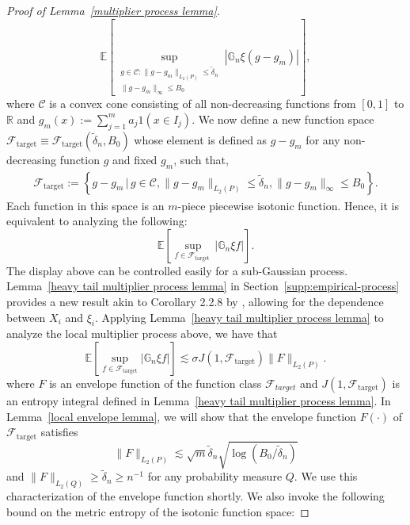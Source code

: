 \documentclass[12pt]{article}
\begin{document}
\begin{appendices}
\begin{proof}[Proof of Lemma~\ref{multiplier process lemma}]
\begin{equation}\nonumber
     \mathbb{E}\left[ 
\sup _{\substack{g \in \mathcal{C}:\|g-g_m\|_{L_2(P)} \leq \tilde\delta_n
\\\|g-g_m\|_{\infty} \leq B_0}}
\left|\mathbb{G}_n \xi(g-g_m)\right|\right],
\end{equation}
where $ \mathcal{C}$ is a convex cone consisting of all non-decreasing functions from $[0,1]$ to $\mathbb{R}$ and $g_m(x) :=\sum_{j=1}^m a_j1(x\in I_j)$. We now define a new function space $\mathcal{F}_{\textrm{target}} \equiv \mathcal{F}_{\textrm{target}}(\tilde \delta_n, B_0)$ whose element is defined as $g-g_m$ for any non-decreasing function $g$ and fixed $g_m$, such that, 
\begin{align}
	\mathcal{F}_{\textrm{target}}:= \left\{g-g_m\, \bigg| \, g \in \mathcal{C}, \|g-g_m\|_{L_2(P)}\le \tilde \delta_n, \|g-g_m\|_\infty \le B_0\right\}.\nonumber
\end{align}
Each function in this space is an $m$-piece piecewise isotonic function. Hence, it is equivalent to analyzing the following:
\begin{equation*}
\mathbb{E}\left[\sup _{f \in \mathcal{F}_{\text {target }}}\left|\mathbb{G}_n \xi f\right|\right].
\end{equation*}
The display above can be controlled easily for a sub-Gaussian process. Lemma~\ref{heavy tail multiplier process lemma} in Section~\ref{supp:empirical-process} provides a new result akin to Corollary 2.2.8 by \cite{van1996weak}, allowing for the dependence between $X_i$ and $\xi_i$. Applying Lemma~\ref{heavy tail multiplier process lemma} to analyze the local multiplier process above, we have that 
\begin{equation}
    \mathbb{E}\left[\sup_{f\in\mathcal{F}_{\textrm{target}}} \left|\mathbb{G}_n \xi f\right|\right] \lesssim \sigma J(1,\mathcal{F}_{\textrm{target}})\|F\|_{L_2(P)}.\nonumber
\end{equation}
where $F$ is an envelope function of the function class $\mathcal{F}_{target}$ and $J(1,\mathcal{F}_{\textrm{target}})$ is an entropy integral defined in Lemma~\ref{heavy tail multiplier process lemma}. In Lemma~\ref{local envelope lemma}, we will show that the envelope function $F(\cdot)$ of $\mathcal{F}_{\textrm{target}}$ satisfies 
\[\|F\|_{L_2(P)} \lesssim \sqrt{m}\tilde\delta_n \sqrt{\log(B_0/\tilde\delta_n)}\] 
and $\|F\|_{L_2(Q)} \geq \tilde\delta_n \geq n^{-1}$ for any probability measure $Q$. We use this characterization of the envelope function shortly. We also invoke the following bound on the metric entropy of the isotonic function space: 

\end{proof}
\end{appendices}
\end{document}
